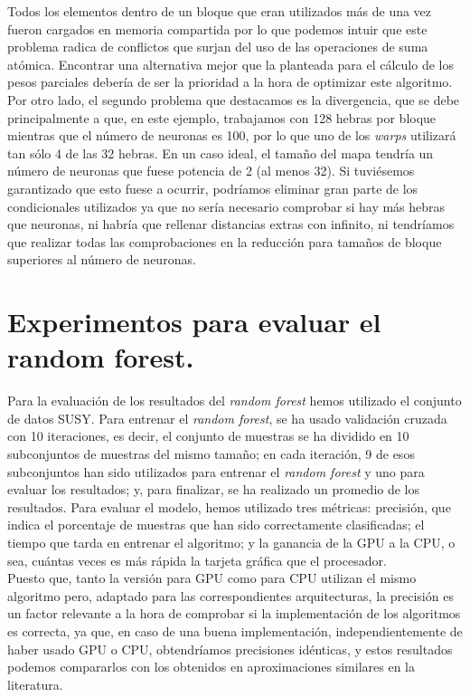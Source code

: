  Todos los elementos dentro de un bloque que eran utilizados más de una vez fueron cargados en memoria compartida por lo que podemos intuir que este problema radica de conflictos que surjan del uso de las operaciones de suma atómica. Encontrar una alternativa mejor que la planteada para el cálculo de los pesos parciales debería de ser la prioridad a la hora de optimizar este algoritmo. \\

 Por otro lado, el segundo problema que destacamos es la divergencia, que se debe principalmente a que, en este ejemplo, trabajamos con 128 hebras por bloque mientras que el número de neuronas es 100, por lo que uno de los \textit{warps} utilizará tan sólo 4 de las 32 hebras. En un caso ideal, el tamaño del mapa tendría un número de neuronas que fuese potencia de 2 (al menos 32). Si tuviésemos garantizado que esto fuese a ocurrir, podríamos eliminar gran parte de los condicionales utilizados ya que no sería necesario comprobar si hay más hebras que neuronas, ni habría que rellenar distancias extras con infinito, ni tendríamos que realizar todas las comprobaciones en la reducción para tamaños de bloque superiores al número de neuronas.

\section{Experimentos para evaluar el random forest.}
Para la evaluación de los resultados del \textit{random forest} hemos utilizado el conjunto de datos SUSY. Para entrenar el \textit{random forest}, se ha usado validación cruzada con 10 iteraciones, es decir, el conjunto de muestras se ha dividido en 10 subconjuntos de muestras del mismo tamaño; en cada iteración, 9 de esos subconjuntos han sido utilizados para entrenar el \textit{random forest} y uno para evaluar los resultados; y, para finalizar, se ha realizado un promedio de los resultados. Para evaluar el modelo, hemos utilizado tres métricas: precisión, que indica el porcentaje de muestras que han sido correctamente clasificadas; el tiempo que tarda en entrenar el algoritmo; y la ganancia de la GPU a la CPU, o sea, cuántas veces es más rápida la tarjeta gráfica que el procesador. \\

Puesto que, tanto la versión para GPU como para CPU utilizan el mismo algoritmo pero, adaptado para las correspondientes arquitecturas, la precisión es un factor relevante a la hora de comprobar si la implementación de los algoritmos es correcta, ya que, en caso de una buena implementación, independientemente de haber usado GPU o CPU, obtendríamos precisiones idénticas, y estos resultados podemos compararlos con los obtenidos en aproximaciones similares en la literatura. \\

